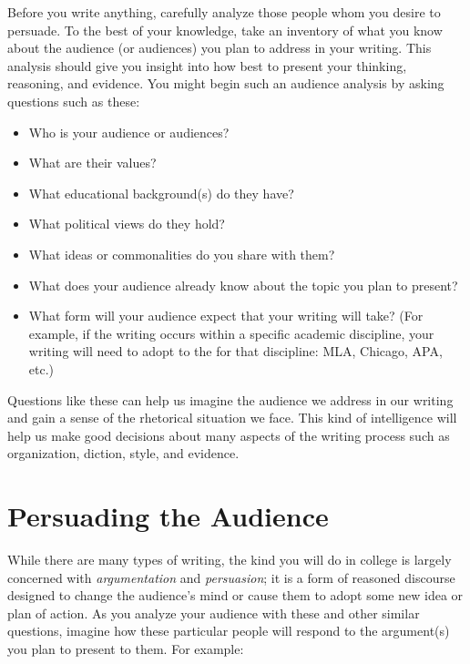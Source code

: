 Before you write anything, carefully analyze those people whom you desire to
persuade. To the best of your knowledge, take an inventory of what you know about the audience (or audiences)
you plan to address in your writing. This analysis should give you 
insight into how best to present your thinking, reasoning, and evidence. You might begin such an audience analysis by asking questions such as these: \begin{itemize}

\item Who is your audience or audiences? 
\item What are their values? 
\item What educational background(s) do they have? 
\item What political views do they hold?
\item What ideas or commonalities do you share with them? 
\item What does your audience already know about the topic you plan to present? 
\item What form will your audience expect that your writing will take? (For example, if the writing occurs within a specific academic discipline, your writing will need to adopt to the \hyperlink{citation}{\color{Ahrenge}{preferred style}} for that discipline: MLA, Chicago, APA, etc.)

\end{itemize}
\noindent Questions like these can help us imagine the audience we address in
our writing and gain a sense of the rhetorical situation we face. This kind of
intelligence will help us make good decisions about many aspects of the writing
process such as organization, diction, style, and evidence.

\section{Persuading the Audience} 

While there are many types of writing, the kind you will do in college is largely concerned with \emph{argumentation} and \emph{persuasion}; it is a form of reasoned discourse designed to change the audience's mind or cause them to adopt some new idea or plan of action. As you analyze your audience with these and other similar questions, imagine how these particular people will respond to the argument(s) you plan to present to them. For example:

